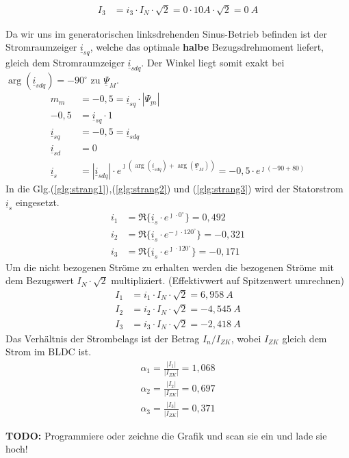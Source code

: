 \begin{solution}
\begin{compactenum}
\begin{align}
I_3 & = i_3 \cdot I_N \cdot \sqrt{2} =0 \cdot 10 A \cdot \sqrt{2} =0~A
\end{align}
\item Da wir uns im generatorischen linksdrehenden Sinus-Betrieb befinden ist der Stromraumzeiger $\underline{i}_{sq}$, welche das optimale \textbf{halbe} Bezugsdrehmoment liefert, gleich dem Stromraumzeiger $\underline{i}_{sdq}$. Der Winkel liegt somit exakt bei $\arg(\underline{i}_{sdq})=-90^\circ$ zu $\underline{\Psi}_M$.
\begin{align}
m_m &= -0,5 = \underline{i}_{sq} \cdot |\underline{\Psi_m}|\\
-0,5 &= \underline{i}_{sq} \cdot 1\\
\underline{i}_{sq} &= -0,5 = \underline{i}_{sdq} \\
\underline{i}_{sd} &= 0\\
\underline{i}_{s} &= |\underline{i}_{sdq}| \cdot e^{\jmath (\arg(\underline{i}_{sdq}) + \arg(\underline{\Psi}_{M}))}= -0,5 \cdot e^{\jmath (-90 + 80)}
\end{align}
In die Glg.(\ref{glg:strang1}),(\ref{glg:strang2}) und (\ref{glg:strang3}) wird der Statorstrom $\underline{i}_s$ eingesetzt.
\begin{align}
i_1 & = \Re \{ \underline{i}_s \cdot e^{\jmath \cdot 0 ^\circ} \} = 0,492\\
i_2 & = \Re \{ \underline{i}_s \cdot e^{-\jmath \cdot 120 ^\circ} \} = -0,321 \\
i_3 & = \Re \{ \underline{i}_s \cdot e^{\jmath \cdot 120 ^\circ} \}=  -0,171
\end{align}
Um die nicht bezogenen Ströme zu erhalten werden die bezogenen Ströme mit dem Bezugswert $I_N \cdot \sqrt{2}$ multipliziert. (Effektivwert auf Spitzenwert umrechnen)
\begin{align}
I_1 & = i_1 \cdot I_N \cdot \sqrt{2}  =6,958~A \\
I_2 & = i_2 \cdot I_N \cdot \sqrt{2} =-4,545~A \\
I_3 & = i_3 \cdot I_N \cdot \sqrt{2} =-2,418~A
\end{align}
Das Verhältnis der Strombelags ist der Betrag $I_n/ I_{ZK}$, wobei $I_{ZK}$ gleich dem Strom im BLDC ist.
\begin{align}
\alpha_1 = \frac{|I_1|}{|I_{ZK}|}= 1,068\\
\alpha_2 = \frac{|I_2|}{|I_{ZK}|}= 0,697\\
\alpha_3 = \frac{|I_3|}{|I_{ZK}|}= 0,371
\end{align}
\item \textbf{TODO:} Programmiere oder zeichne die Grafik und scan sie ein und lade sie hoch!

\end{compactenum}
\end{solution}
